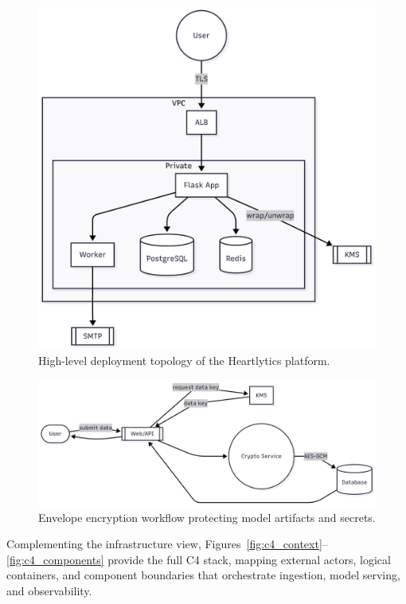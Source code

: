 \documentclass[conference]{IEEEtran}
\begin{document}
\begin{figure}[t]
  \centering
  \includegraphics[width=0.9\linewidth]{deployment_topology.png}
  \caption{High-level deployment topology of the Heartlytics platform.}
  \label{fig:topology}
\end{figure}

\begin{figure}[t]
  \centering
  \includegraphics[width=0.9\linewidth]{envelope_encryption_workflow.png}
  \caption{Envelope encryption workflow protecting model artifacts and secrets.}
  \label{fig:encryption}
\end{figure}

Complementing the infrastructure view, Figures~\ref{fig:c4_context}--\ref{fig:c4_components} provide the full C4 stack, mapping external actors, logical containers, and component boundaries that orchestrate ingestion, model serving, and observability.
\end{document}
